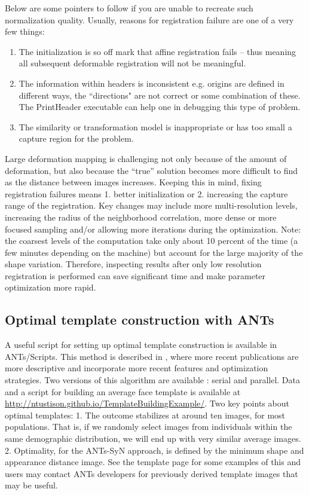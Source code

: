 \documentclass{InsightArticle}
\begin{document}
Below are some pointers to follow if you are unable to recreate such normalization quality.  
Usually, reasons for registration failure are one of a very few things: 
\begin{enumerate}
\item The initialization is so off mark that affine registration fails -- thus meaning all subsequent deformable registration will not be meaningful.
\item The information within headers is inconsistent e.g. origins are defined in different ways, the ``directions" are not correct or some combination of these.    The PrintHeader executable can help one in debugging this type of problem.  
\item  The similarity or transformation model is inappropriate or has too small a capture region for the problem. 
\end{enumerate}

Large deformation mapping is challenging not only because of the
amount of deformation, but also because the ``true'' solution becomes
more difficult to find as the distance between images increases.
Keeping this in mind, fixing registration failures means 1. better
initialization or 2. increasing the capture range of the registration. 
Key changes may include more multi-resolution levels, increasing the radius of the neighborhood
correlation, more dense or more focused sampling and/or 
allowing more iterations during the optimization.  
Note: the coarsest levels of the computation take only about
10 percent of the time (a few minutes depending on the machine)
but account for the large majority of the shape variation.  Therefore,
inspecting results after only low resolution registration is performed
can save significant time and make parameter optimization more rapid.

\subsection{Optimal template construction with ANTs}
A useful script for setting up optimal template construction
 is available in ANTs/Scripts.  This method is described in \cite{Avants2004,Avants2006d,Kim2008,Yushkevich2009,Avants2009c}, 
where more recent publications are more descriptive and incorporate 
more recent features and optimization strategies. 
Two versions of this algorithm are available : serial and parallel.  
Data and a script for building an average face template is available 
at \href{http://ntustison.github.io/TemplateBuildingExample/}{http://ntustison.github.io/TemplateBuildingExample/}.  Two key points about optimal templates:
1. The outcome stabilizes at around ten images, for most populations.
That is, if we randomly select images from individuals within the same 
demographic distribution, we will end up with very similar average images.  
2.  Optimality, for the ANTs-SyN approach, is defined by the minimum shape 
and appearance distance image. 
See the template page for some examples of this and users may 
contact ANTs developers for previously derived template 
images that may be useful. 
\end{document}
